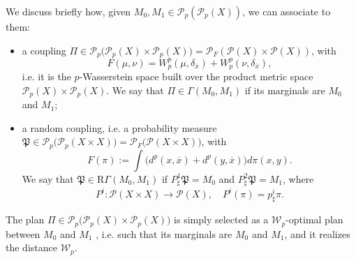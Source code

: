 \documentclass[10pt,leqno]{amsart}
\numberwithin{equation}{section}
\newcommand{\PP}{\mathcal{P}}
\begin{document}
We discuss briefly how, given $M_0,M_1 \in \PP_p(\PP_p(X))$, we can associate to them:
\begin{itemize}
    \item a coupling $\Pi \in \PP_p\big(\PP_p(X)\times\PP_p(X)\big) = \PP_F(\PP(X)\times \PP(X))$, with 
    \[F(\mu,\nu) = W_{p}^p(\mu,\delta_{\overline{x}}) + W_{p}^p(\nu,\delta_{\overline{x}}),\]
    i.e. it is the $p$-Wasserstein space built over the product metric space $\PP_p(X)\times\PP_p(X)$. We say that $\Pi\in \Gamma(M_0,M_1)$ if its marginals are $M_0$ and $M_1$;
    \item a random coupling, i.e. a probability measure $\mathfrak{P}\in\PP_p\big(\PP_p(X\times X)\big) = \PP_F\big(\PP(X\times X)\big)$, with \[F(\pi) := \int \Big(d^p(x,\overline{x}) + d^p(y,\overline{x}) \Big) d\pi(x,y).\]
    We say that $\mathfrak{P}\in \mathrm{R}\Gamma(M_0,M_1)$ if $P^1_\sharp \mathfrak{P} = M_0$ and $P^2_\sharp \mathfrak{P} = M_1$, where 
    \begin{equation}
        P^i:\PP(X\times X) \to \PP(X), \quad P^i(\pi) = p^i_\sharp \pi.
    \end{equation}
\end{itemize}





The plan $\Pi \in \PP_p\big(\PP_p(X)\times\PP_p(X)\big)$ is simply selected as a $\mathcal{W}_p$-optimal plan between $M_0$ and $M_1$ , i.e. such that its marginals are $M_0$ and $M_1$, and it realizes the distance $\mathcal{W}_p$. 
\end{document}
